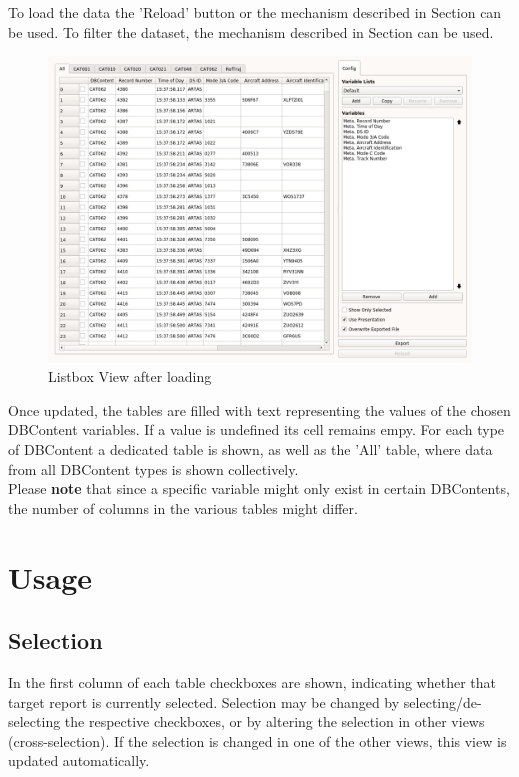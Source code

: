 To load the data the 'Reload' button or the mechanism described in Section  can be used. To filter the dataset, the mechanism described in Section  can be used. \\

\begin{figure}[H]
    \hspace*{-2cm}
    \includegraphics[width=18cm,frame]{figures/listbox_loaded.png}
  \caption{Listbox View after loading}
\end{figure}

Once updated, the tables are filled with text representing the values of the chosen DBContent variables. 
If a value is undefined its cell remains empy. For each type of DBContent a dedicated table is shown, as well as the 'All' table, where data from all DBContent types is shown collectively. \\

Please \textbf{note} that since a specific variable might only exist in certain DBContents, the number of columns in the various tables might differ.

\section{Usage}

\subsection{Selection}

In the first column of each table checkboxes are shown, indicating whether that target report is currently selected. 
Selection may be changed by selecting/de-selecting the respective checkboxes, or by altering the selection in other views (cross-selection). 
If the selection is changed in one of the other views, this view is updated automatically.

